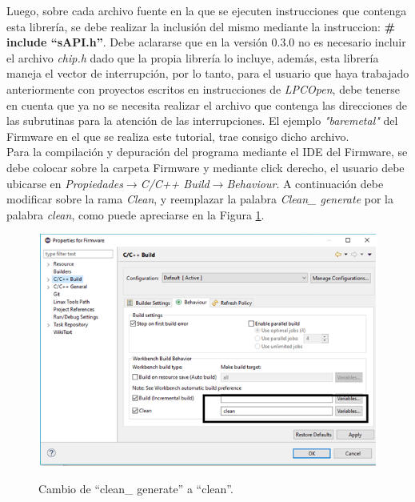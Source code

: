 \documentclass[12pt,letterpaper]{article}
\begin{document}
Luego, sobre cada archivo fuente en la que se ejecuten instrucciones que contenga esta librería, se debe realizar la inclusión del mismo mediante la instruccion: \textbf{\# include “sAPI.h”}. Debe aclararse que en la versión 0.3.0 no es necesario incluir el archivo \textit{chip.h} dado que la propia librería lo incluye, además, esta librería maneja el vector de interrupción, por lo tanto, para el usuario que haya trabajado anteriormente con proyectos escritos en instrucciones de \textit{LPCOpen}, debe tenerse en cuenta que ya no se necesita realizar el archivo que contenga las direcciones de las subrutinas para la atención de las interrupciones. El ejemplo \textit{"baremetal"} del Firmware en el que se realiza este tutorial, trae consigo dicho archivo.
 \\
 
Para la compilación y depuración del programa mediante el IDE del Firmware, se debe colocar sobre la carpeta Firmware y mediante click derecho, el usuario debe ubicarse en \textit{Propiedades}$\rightarrow$\textit{C/C++ Build}$\rightarrow$\textit{Behaviour}. A continuación debe modificar sobre la rama \textit{Clean}, y reemplazar la palabra \textit{Clean\_ generate} por la palabra \textit{clean}, como puede apreciarse en la Figura \ref{Fig19}.
\begin{figure}[H]
\centering
\includegraphics[width=8 cm]{figuras/f1.png}\\
\caption{Cambio de “clean\_ generate” a “clean”.}
\label{Fig19}
\end{figure}
\end{document}
